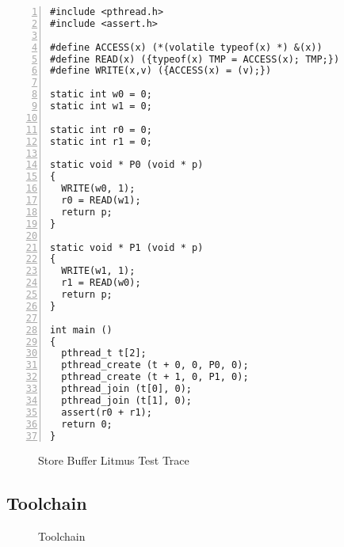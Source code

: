 \begin{lstlisting}[style=c++, numbers=left, numberstyle=\footnotesize, numberblanklines=false, caption={Store Buffer Litmus Test}, label={fig:intro:code}]
#include <pthread.h>
#include <assert.h>

#define ACCESS(x) (*(volatile typeof(x) *) &(x))
#define READ(x) ({typeof(x) TMP = ACCESS(x); TMP;})
#define WRITE(x,v) ({ACCESS(x) = (v);})

static int w0 = 0;
static int w1 = 0;

static int r0 = 0;
static int r1 = 0;

static void * P0 (void * p)
{
  WRITE(w0, 1);
  r0 = READ(w1);
  return p;
}

static void * P1 (void * p)
{
  WRITE(w1, 1);
  r1 = READ(w0);
  return p;
}

int main ()
{
  pthread_t t[2];
  pthread_create (t + 0, 0, P0, 0);
  pthread_create (t + 1, 0, P1, 0);
  pthread_join (t[0], 0);
  pthread_join (t[1], 0);
  assert(r0 + r1);
  return 0;
}
\end{lstlisting}

\begin{figure}[!h]
  \centering
  
  \caption{Store Buffer Litmus Test Trace}
\end{figure}




\subsection{Toolchain}

\begin{figure}[h]
  \centering
  
  \caption{Toolchain}
\end{figure}

